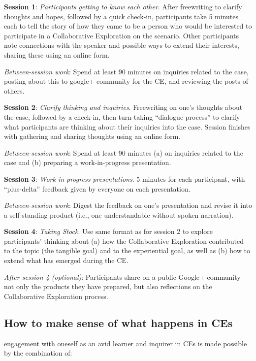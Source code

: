 \textbf{Session 1}: \emph{Participants getting to know each other}.
After freewriting to clarify thoughts and hopes, followed by a quick
check-in, participants take 5 minutes each to tell the story of how they
came to be a person who would be interested to participate in a
Collaborative Exploration on the scenario. Other participants note
connections with the speaker and possible ways to extend their
interests, sharing these using an online form.

\emph{Between-session work}: Spend at least 90 minutes on inquiries
related to the case, posting about this to google+ community for the CE,
and reviewing the posts of others.

\textbf{Session 2}: \emph{Clarify thinking and inquiries}. Freewriting
on one's thoughts about the case, followed by a check-in, then
turn-taking ``dialogue process'' to clarify what participants are
thinking about their inquiries into the case. Session finishes with
gathering and sharing thoughts using an online form.

\emph{Between-session work}: Spend at least 90 minutes (a) on inquiries
related to the case and (b) preparing a work-in-progress presentation.

\textbf{Session 3}: \emph{Work-in-progress presentations}. 5 minutes for
each participant, with ``plus-delta'' feedback given by everyone on each
presentation.

\emph{Between-session work}: Digest the feedback on one's presentation
and revise it into a self-standing product (i.e., one understandable
without spoken narration).

\textbf{Session 4}: \emph{Taking Stock}. Use same format as for session
2 to explore participants' thinking about (a) how the Collaborative
Exploration contributed to the topic (the tangible goal) and to the
experiential goal, as well as (b) how to extend what has emerged during
the CE.

\emph{After session 4 (optional)}: Participants share on a public
Google+ community not only the products they have prepared, but also
reflections on the Collaborative Exploration process.

\subsection{How to make sense of what happens in
CEs}\label{how-to-make-sense-of-what-happens-in-ces}

engagement with oneself as an avid learner and inquirer in CEs is made
possible by the combination of:

